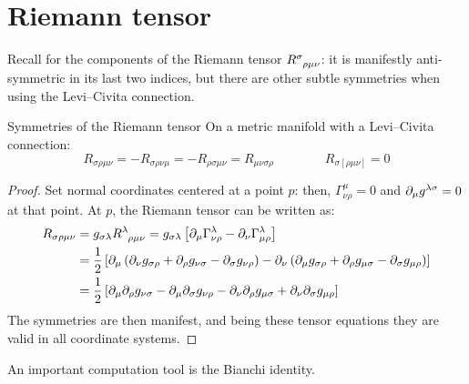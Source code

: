 \newpage
\section{Riemann tensor}

Recall  for the components of the Riemann tensor $ \tensor{R}{^\sigma _{\rho \mu \nu}} $: it is manifestly anti-symmetric in its last two indices, but there are other subtle symmetries when using the Levi--Civita connection.

\begin{proposition}{Symmetries of the Riemann tensor}{}
  On a metric manifold with a Levi--Civita connection:
  \begin{equation}
    R_{\sigma \rho \mu \nu} = - R_{\sigma \rho \nu \mu} = - R_{\rho \sigma \mu \nu} = R_{\mu \nu \sigma \rho}
    \qquad \qquad
    R_{\sigma [\rho \mu \nu]} = 0
    \label{eq:riemann-symm}
  \end{equation}
\end{proposition}

\begin{proofbox}
  \begin{proof}
    Set normal coordinates centered at a point $ p $: then, $ \Gamma^\mu_{\nu \rho} = 0 $ and $ \partial_\mu g^{\lambda \sigma} = 0 $ at that point. At $ p $, the Riemann tensor can be written as:
    \begin{equation*}
      \begin{split}
        R_{\sigma \rho \mu \nu}
        &= g_{\sigma \lambda} \tensor{R}{^\lambda _{\rho \mu \nu}} = g_{\sigma \lambda} \left[ \pa_\mu \Gamma^\lambda_{\nu \rho} - \pa_\nu \Gamma^\lambda_{\mu \rho} \right] \\
        &= \frac{1}{2} \left[ \pa_\mu \left( \pa_\nu g_{\sigma \rho} + \pa_\rho g_{\nu \sigma} - \pa_\sigma g_{\nu \rho} \right) - \pa_\nu \left( \pa_\mu g_{\sigma \rho} + \pa_\rho g_{\mu \sigma} - \pa_\sigma g_{\mu \rho} \right) \right] \\
        &= \frac{1}{2} \left[ \pa_\mu \pa_\rho g_{\nu \sigma} - \pa_\mu \pa_\sigma g_{\nu \rho} - \pa_\nu \pa_\rho g_{\mu \sigma} + \pa_\nu \pa_\sigma g_{\mu \rho} \right]
      \end{split}
    \end{equation*}
    The symmetries are then manifest, and being these tensor equations they are valid in all coordinate systems.
  \end{proof}
\end{proofbox}

An important computation tool is the Bianchi identity.


